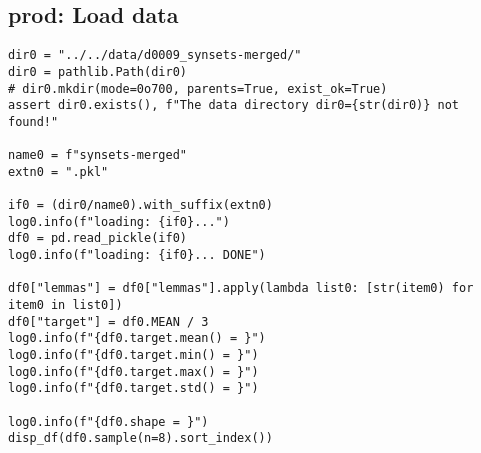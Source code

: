 \documentclass[a4paper,10pt,onecolumn,oneside,openright]{article}
\begin{document}
\subsection{prod: Load data}
\label{sec:org0888c9b}
\begin{verbatim}
dir0 = "../../data/d0009_synsets-merged/"
dir0 = pathlib.Path(dir0)
# dir0.mkdir(mode=0o700, parents=True, exist_ok=True)
assert dir0.exists(), f"The data directory dir0={str(dir0)} not found!"

name0 = f"synsets-merged"
extn0 = ".pkl"

if0 = (dir0/name0).with_suffix(extn0)
log0.info(f"loading: {if0}...")
df0 = pd.read_pickle(if0)
log0.info(f"loading: {if0}... DONE")

df0["lemmas"] = df0["lemmas"].apply(lambda list0: [str(item0) for item0 in list0])
df0["target"] = df0.MEAN / 3
log0.info(f"{df0.target.mean() = }")
log0.info(f"{df0.target.min() = }")
log0.info(f"{df0.target.max() = }")
log0.info(f"{df0.target.std() = }")

log0.info(f"{df0.shape = }")
disp_df(df0.sample(n=8).sort_index())
\end{verbatim}
\end{document}
